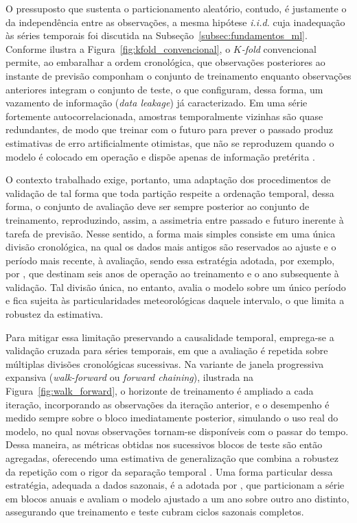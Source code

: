 O pressuposto que sustenta o particionamento aleatório, contudo, é justamente o
da independência entre as observações, a mesma hipótese \textit{i.i.d.} cuja
inadequação às séries temporais foi discutida na
Subseção~\ref{subsec:fundamentos_ml}. Conforme ilustra a
Figura~\ref{fig:kfold_convencional}, o
\textit{$K$-fold} convencional permite, ao embaralhar a ordem cronológica, que observações posteriores ao instante de
previsão componham o conjunto de treinamento enquanto observações anteriores
integram o conjunto de teste, o que configuram, dessa forma, um vazamento de informação
(\textit{data leakage}) já caracterizado. Em uma série fortemente
autocorrelacionada, amostras temporalmente vizinhas são quase redundantes, de
modo que treinar com o futuro para prever o passado produz estimativas de erro
artificialmente otimistas, que não se reproduzem quando o modelo é colocado em
operação e dispõe apenas de informação pretérita \cite{hyndman2021}.


O contexto trabalhado exige, portanto, uma adaptação dos procedimentos de validação de tal forma que
toda partição respeite a ordenação temporal, dessa forma, o conjunto de avaliação deve ser
sempre posterior ao conjunto de treinamento, reproduzindo, assim, a assimetria entre
passado e futuro inerente à tarefa de previsão. Nesse sentido, a forma mais simples consiste em
uma única divisão cronológica, na qual os dados mais antigos são reservados ao
ajuste e o período mais recente, à avaliação, sendo essa estratégia adotada, por exemplo,
por , que destinam seis anos de operação ao treinamento e
o ano subsequente à validação. Tal divisão única, no entanto, avalia o modelo
sobre um único período e fica sujeita às particularidades meteorológicas daquele
intervalo, o que limita a robustez da estimativa.

Para mitigar essa limitação preservando a causalidade temporal, emprega-se a
validação cruzada para séries temporais, em que a avaliação é repetida sobre
múltiplas divisões cronológicas sucessivas. Na variante de janela progressiva
expansiva (\textit{walk-forward} ou \textit{forward chaining}), ilustrada na
Figura~\ref{fig:walk_forward}, o horizonte de treinamento é ampliado a cada
iteração, incorporando as observações da iteração anterior, e o desempenho é
medido sempre sobre o bloco imediatamente posterior, simulando o uso real do
modelo, no qual novas observações tornam-se disponíveis com o passar do tempo. Dessa maneira, as
métricas obtidas nos sucessivos blocos de teste são então agregadas, oferecendo
uma estimativa de generalização que combina a robustez da repetição com o rigor
da separação temporal \cite{hyndman2021}. Uma forma particular dessa estratégia,
adequada a dados sazonais, é a adotada por , que
particionam a série em blocos anuais e avaliam o modelo ajustado a um ano sobre
outro ano distinto, assegurando que treinamento e teste cubram ciclos sazonais
completos.

